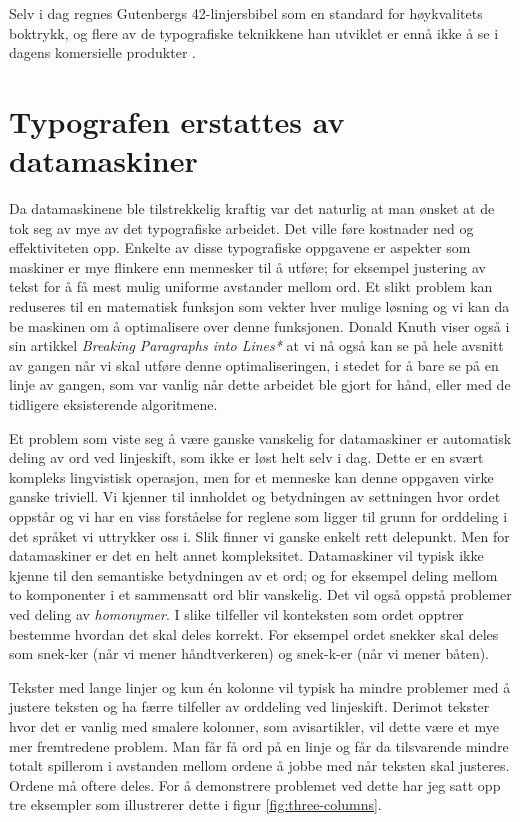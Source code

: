 Selv i dag regnes Gutenbergs 42-linjersbibel som en standard for høykvalitets boktrykk, og flere av de typografiske teknikkene han utviklet er ennå ikke å se i dagens komersielle produkter \cite{thanh2000microtypographic}.


\section{Typografen erstattes av datamaskiner}

Da datamaskinene ble tilstrekkelig kraftig var det naturlig at man ønsket at de tok seg av mye av det typografiske arbeidet. Det ville føre kostnader ned og effektiviteten opp. Enkelte av disse typografiske oppgavene er aspekter som maskiner er mye flinkere enn mennesker til å utføre; for eksempel justering av tekst for å få mest mulig uniforme avstander mellom ord. Et slikt problem kan reduseres til en matematisk funksjon som vekter hver mulige løsning og vi kan da be maskinen om å optimalisere over denne funksjonen. Donald Knuth viser også i sin artikkel \textit{Breaking Paragraphs into Lines*} \cite{knuth1981breaking} at vi nå også kan se på hele avsnitt av gangen når vi skal utføre denne optimaliseringen, i stedet for å bare se på en linje av gangen, som var vanlig når dette arbeidet ble gjort for hånd, eller med de tidligere eksisterende algoritmene.

Et problem som viste seg å være ganske vanskelig for datamaskiner er automatisk deling av ord ved linjeskift, som ikke er løst helt selv i dag. Dette er en svært kompleks lingvistisk operasjon, men for et menneske kan denne oppgaven virke ganske triviell. Vi kjenner til innholdet og betydningen av settningen hvor ordet oppstår og vi har en viss forståelse for reglene som ligger til grunn for orddeling i det språket vi uttrykker oss i. Slik finner vi ganske enkelt rett delepunkt. Men for datamaskiner er det en helt annet kompleksitet. Datamaskiner vil typisk ikke kjenne til den semantiske betydningen av et ord; og for eksempel deling mellom to komponenter i et sammensatt ord blir vanskelig. Det vil også oppstå problemer ved deling av \textit{homonymer}.  I slike tilfeller vil konteksten som ordet opptrer bestemme hvordan det skal deles korrekt. For eksempel ordet snekker skal deles som snek-ker (når vi mener håndtverkeren) og snek-k-er (når vi mener båten).

Tekster med lange linjer og kun én kolonne vil typisk ha mindre problemer med å justere teksten og ha færre tilfeller av orddeling ved linjeskift. Derimot tekster hvor det er vanlig med smalere kolonner, som avisartikler, vil dette være et mye mer fremtredene problem. Man får få ord på en linje og får da tilsvarende mindre totalt spillerom i avstanden mellom ordene å jobbe med når teksten skal justeres. Ordene må oftere deles. For å demonstrere problemet ved dette har jeg satt opp tre eksempler som illustrerer dette i figur \ref{fig:three-columns}. 

